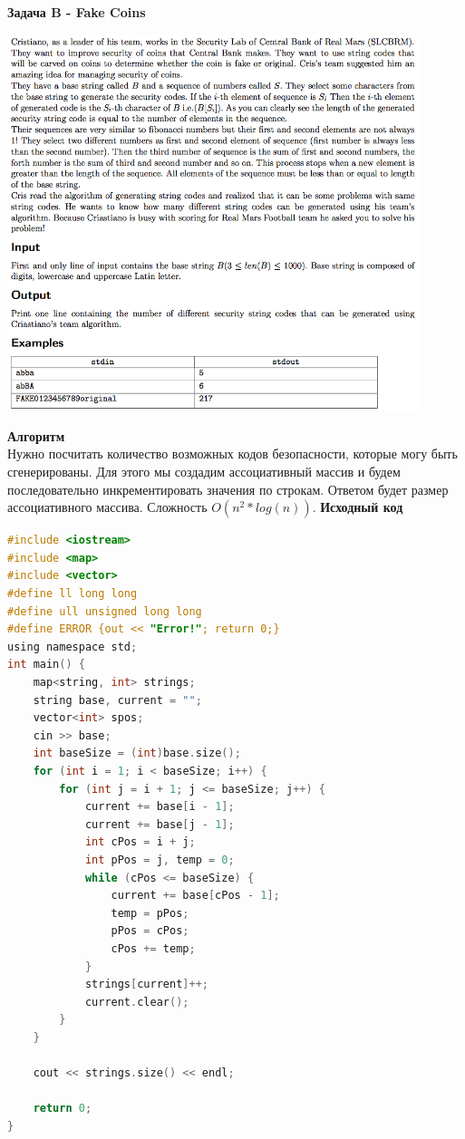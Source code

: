 \documentclass[a4paper,12pt]{article}
\begin{document}
\newpage
\textbf{{\large Задача B - Fake Coins}} \\
\begin{center}
\includegraphics[width=0.9\textwidth]{CT_S02E10/CT_S02E10_B.png}\\ [1cm]
\end{center}
\textbf{{\large Алгоритм}} \\
Нужно посчитать количество возможных кодов безопасности, которые могу быть сгенерированы. Для этого мы создадим ассоциативный массив и будем последовательно инкрементировать значения по строкам. Ответом будет размер ассоциативного массива. Сложность $O(n^2*log(n))$.
\newpage
\textbf{{\large Исходный код}} \\
\begin{lstlisting}[language=C]
#include <iostream>
#include <map>
#include <vector>
#define ll long long
#define ull unsigned long long
#define ERROR {out << "Error!"; return 0;}
using namespace std;
int main() {
    map<string, int> strings;
    string base, current = "";
    vector<int> spos;
    cin >> base;
    int baseSize = (int)base.size();
    for (int i = 1; i < baseSize; i++) {
        for (int j = i + 1; j <= baseSize; j++) {
            current += base[i - 1];
            current += base[j - 1];
            int cPos = i + j;
            int pPos = j, temp = 0;
            while (cPos <= baseSize) {
                current += base[cPos - 1];
                temp = pPos;
                pPos = cPos;
                cPos += temp;
            }
            strings[current]++;
            current.clear();
        }
    }
    
    cout << strings.size() << endl;
    
    return 0;
}
\end{lstlisting}
\end{document}
